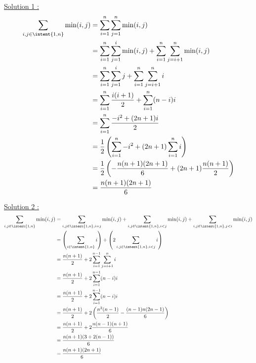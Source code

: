 \documentclass[a4paper, 11pt,reqno]{article}
\begin{document}
\begin{correction}
\underline{Solution 1 :} 
\begin{align*}
\sum_{i,j \in \intent{1,n}} \min(i,j) &= \sum_{i=1}^n \sum_{j=1}^n\min(i,j)\\
												&= \sum_{i=1}^n \sum_{j=1}^i\min(i,j) + \sum_{i=1}^n \sum_{j=i+1}^n\min(i,j)\\
												&= \sum_{i=1}^n \sum_{j=1}^i j  + \sum_{i=1}^n \sum_{j=i+1}^n i\\
													&= \sum_{i=1}^n \frac{i(i+1)}{2}+ \sum_{i=1}^n (n-i) i\\
													&= \sum_{i=1}^n \frac{-i^2+(2n+1)i}{2}\\		
													&= \frac{1}{2} \left( \sum_{i=1}^n -i^2  + (2n+1)\sum_{i=1}^ni \right)\\																					&= \frac{1}{2} \left(-\frac{n(n+1)(2n+1)}{6} +(2n+1)\frac{n(n+1)}{2}\right)\\											
													&=\frac{n(n+1)(2n+1)}{6} 
\end{align*}



\underline{Solution 2 :}
\begin{align*}
\sum_{i,j \in \intent{1,n}} \min(i,j)  &= \sum_{i,j \in \intent{1,n}, i=j} \min(i,j)  +\sum_{i,j \in \intent{1,n}, i<j } \min(i,j)  + \sum_{i,j \in \intent{1,n}, j<i } \min(i,j) \\
										&=\left( \sum_{i \in \intent{1,n} } i \right) +\left(2\sum_{i,j \in \intent{1,n}, i< j } i \right)\\
										&= \frac{n(n+1)}{2} + 2 \sum_{i=1}^{n-1}\sum_{j=i+1}^n i \\
										&= \frac{n(n+1)}{2} + 2 \sum_{i=1}^{n-1}(n-i) i \\
										&= \frac{n(n+1)}{2} + 2 \sum_{i=1}^{n-1}(n-i) i \\
										&= \frac{n(n+1)}{2} + 2 \left( \frac{n^2(n-1)}{2}  - \frac{(n-1)n(2n-1)}{6}     \right)  \\
											&= \frac{n(n+1)}{2} + 2 \frac{n(n-1)(n+1)}{6} \\
											&= \frac{n(n+1) (3 +2(n-1))}{6} \\
											&= \frac{n(n+1) (2n+1)}{6} 
\end{align*}


\end{correction}
\end{document}
